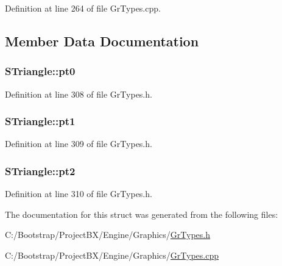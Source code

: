Definition at line 264 of file GrTypes.cpp.

\subsection{Member Data Documentation}
\hypertarget{struct_s_triangle_5838f7a1465e40e3a74c08e7a0b9f03a}{
\subsubsection[{pt0}]{ {\bf STriangle::pt0}}}
\label{struct_s_triangle_5838f7a1465e40e3a74c08e7a0b9f03a}




Definition at line 308 of file GrTypes.h.\hypertarget{struct_s_triangle_42265ebbf2f6ad015e0fae5396e65ef7}{
\subsubsection[{pt1}]{ {\bf STriangle::pt1}}}
\label{struct_s_triangle_42265ebbf2f6ad015e0fae5396e65ef7}




Definition at line 309 of file GrTypes.h.\hypertarget{struct_s_triangle_e168760ee842e2d1fce900ca6540169f}{
\subsubsection[{pt2}]{ {\bf STriangle::pt2}}}
\label{struct_s_triangle_e168760ee842e2d1fce900ca6540169f}




Definition at line 310 of file GrTypes.h.

The documentation for this struct was generated from the following files:\begin{CompactItemize}
\item 
C:/Bootstrap/ProjectBX/Engine/Graphics/\hyperlink{_gr_types_8h}{GrTypes.h}\item 
C:/Bootstrap/ProjectBX/Engine/Graphics/\hyperlink{_gr_types_8cpp}{GrTypes.cpp}\end{CompactItemize}
